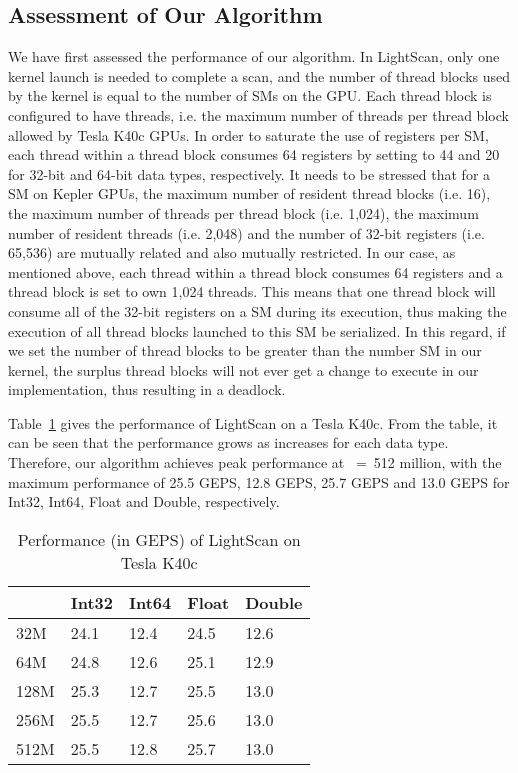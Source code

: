 \documentclass[article]{elsarticle}
\renewcommand{\hl}[1]{#1}
\begin{document}
{\subsection{Assessment of Our Algorithm}
We have first assessed the performance of our algorithm. In LightScan, only one kernel launch is needed to complete a scan, and the number of thread blocks used by the kernel is equal to the number of SMs on the GPU. Each thread block is configured to have  threads, i.e. the maximum number of threads per thread block allowed by Tesla K40c GPUs. In order to saturate the use of registers per SM, each thread within a thread block consumes 64 registers by setting  to 44 and 20 for 32-bit and 64-bit data types, respectively. \hl{It needs to be stressed that for a SM on Kepler GPUs, the maximum number of resident thread blocks (i.e. 16), the maximum number of threads per thread block (i.e. 1,024), the maximum number of resident threads (i.e. 2,048) and the number of 32-bit registers (i.e. 65,536) are mutually related and also mutually restricted. In our case, as mentioned above, each thread within a thread block consumes 64 registers and a thread block is set to own 1,024 threads. This means that one thread block will consume all of the 32-bit registers on a SM during its execution, thus making the execution of all thread blocks launched to this SM be serialized. In this regard, if we set the number of thread blocks to be greater than the number SM in our kernel, the surplus thread blocks will not ever get a change to execute in our implementation, thus resulting in a deadlock.}

Table~\ref{tab:lightscan} gives the performance of LightScan on a Tesla K40c. From the table, it can be seen that the performance grows as  increases for each data type. Therefore, our algorithm achieves peak performance at ~=~512 million, with the maximum performance of 25.5 GEPS, 12.8 GEPS, 25.7 GEPS and 13.0 GEPS for Int32, Int64, Float and Double, respectively.
\begin{table}[!h]
\centering
\caption{Performance (in GEPS) of LightScan on Tesla K40c}
\label{tab:lightscan}
\begin{tabular}{|l||l||l||l||l|}
\hline
&	\textbf{Int32}&	\textbf{Int64}&	\textbf{Float}&	\textbf{Double}\\
\hline
32M&	24.1&	12.4&	24.5&	12.6\\
\hline
64M&	24.8&	12.6&	25.1&	12.9\\
\hline
128M&	25.3&	12.7&	25.5&	13.0\\
\hline
256M&	25.5&	12.7&	25.6&	13.0\\
\hline
512M&	25.5&	12.8&	25.7&	13.0\\
\hline
\end{tabular}
\end{table}

}
\end{document}
